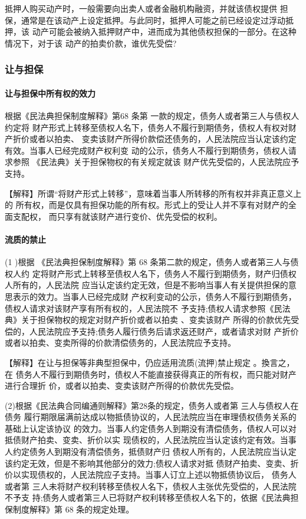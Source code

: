 \documentclass[UTF8,12pt]{ctexart}
\numberwithin{equation}{section} %
\numberwithin{figure}{section}
\numberwithin{table}{section}
\begin{document}
	
	抵押人购买动产时，一般需要向出卖人或者金融机构融资，并就该债权提供 担保，通常是在该动产上设定抵押。与此同时，抵押人可能之前已经设定过浮动抵押，该 动产可能会被纳入抵押财产中，进而成为其他债权担保的一部分。在这种情况下，对于该 动产的拍卖价款，谁优先受偿?
	
	\subsubsection{让与担保}
	\paragraph{让与担保中所有权的效力}
	根据《民法典担保制度解释》第68 条第 一款的规定，债务人或者第三人与债权人约定将 财产形式上转移至债权人名下，债务人不履行到期债务，债权人有权对财产折价或者以拍卖、 变卖该财产所得价款偿还债务的，人民法院应当认定该约定有效。当事人已经完成财产权利变 动的公示，债务人不履行到期债务，债权人请求参照 《民法典》关于担保物权的有关规定就该 财产优先受偿的，人民法院应予支持。
	
	【解释】所谓“将财产形式上转移”，意味着当事人所转移的所有权并非真正意义上的 所有权，而是仅具有担保功能的所有权。形式上的受让人并不享有对财产的全面支配权， 而只享有就该财产进行变价、优先受偿的权利。
	
	\paragraph{流质的禁止}
	(1 )根据 《民法典担保制度解释》第 68 条第二款的规定，债务人或者第三人与债权人约 定将财产形式上转移至债权人名下，债务人不履行到期债务，财产归债权人所有的，人民法院 应当认定该约定无效，但是不影响当事人有关提供担保的意思表示的效力。当事人已经完成财 产权利变动的公示，债务人不履行到期债务，债权人请求对该财产享有所有权的，人民法院不 予支持;债权人请求参照《民法典》关于担保物权的规定对财产折价或者以拍卖 、变卖该财产 所得的价款优先受偿的，人民法院应予支持;债务人履行债务后请求返还财产，或者请求对财 产折价或者以拍卖、变卖所得的价款清偿债务的，人民法院应予支持。
	
	【解释】在让与担保等非典型担保中，仍应适用流质(流押)禁止规定 。換言之，在 债务人不履行到期债务时，债权人不能直接获得真正的所有权，而只能对财产进行合理折 价，或者以拍卖、变卖该财产所得的价款优先受偿。
	
	(2)根据《民法典合同编通则解释》第28条的规定，债务人或者第 三人与债权人在债务 履行期限届满前达成以物抵债协议的，人民法院应当在审理债权债务关系的基础上认定该协议 的效力。当事人约定债务人到期没有清偿债务，债权人可以对抵债财产拍卖、变卖、折价以实 现债权的，人民法院应当认定该约定有效。当事人约定债务人到期没有清偿债务，抵债财产归 债权人所有的，人民法院应当认定该约定无效，但是不影响其他部分的效力;债权人请求对抵 债财产拍卖、变卖、折价以实现债权的，人民法院应子支持。当事人订立上述以物抵债协议后， 债务人或者第 三人未将财产权利转移至债权人名下，债权人主张优先受偿的，人民法院不予支 持;债务人或者第三人已将财产权利转移至债权人名下的，依据《民法典担保制度解释》第 68 条的规定处理。
	
\end{document}
